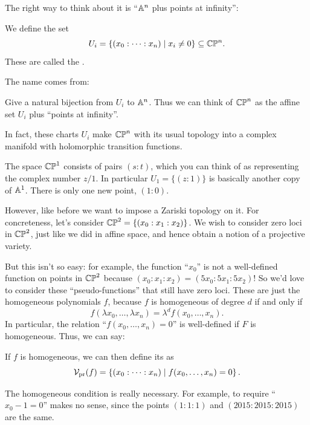 The right way to think about it is ``$\mathbb A^n$ plus points at infinity'':
\begin{definition}
	We define the set
	\[ U_i = \left\{ (x_0 : \dots : x_n) \mid x_i \neq 0  \right\}
		\subseteq \mathbb{CP}^n. \]
	These are called the .
\end{definition}
The name comes from:
\begin{exercise}
	[Mandatory]
	Give a natural bijection from $U_i$ to $\mathbb A^n$.
	Thus we can think of $\mathbb{CP}^n$ as the affine set $U_i$
	plus ``points at infinity''.
\end{exercise}
\begin{remark}
	In fact, these charts $U_i$ make $\mathbb{CP}^n$ with its usual topology
	into a complex manifold with holomorphic transition functions.
\end{remark}

\begin{example}
	[Colloquially, $\CP^1 = \Aff^1 \cup \{\infty\}$]
	The space $\mathbb{CP}^1$ consists of pairs $(s:t)$,
	which you can think of as representing the complex number $z/1$.
	In particular $U_1 = \{ (z:1) \}$
	is basically another copy of $\mathbb A^1$.
	There is only one new point, $(1:0)$.
\end{example}

However, like before we want to impose a Zariski topology on it.
For concreteness, let's consider $\mathbb{CP}^2 = \left\{ (x_0 : x_1 : x_2) \right\}$.
We wish to consider zero loci in $\mathbb{CP}^2$, just like we did in affine space,
and hence obtain a notion of a projective variety.

But this isn't so easy: for example,
the function ``$x_0$'' is not a well-defined function on points in $\mathbb{CP}^2$
because $(x_0 : x_1 : x_2) = (5x_0 : 5x_1 : 5x_2)$!
So we'd love to consider these ``pseudo-functions''
that still have zero loci. These are just the homogeneous polynomials $f$,
because $f$ is homogeneous of degree $d$ if and only if
\[
	f(\lambda x_0, \dots, \lambda x_n)
	= \lambda^d f(x_0, \dots, x_n).
\]
In particular, the relation ``$f(x_0, \dots, x_n) = 0$'' is
well-defined if $F$ is homogeneous. Thus, we can say:
\begin{definition}
	If $f$ is homogeneous, we can then define its  as
	\[
		\mathcal V_{\text{pr}}(f)
		= \left\{ (x_0 : \dots : x_n) \mid f(x_0, \dots, x_n) = 0 \right\}.
	\]
\end{definition}

The homogeneous condition is really necessary.
For example, to require ``$x_0 - 1 = 0$'' makes no sense,
since the points $(1:1:1)$ and $(2015:2015:2015)$ are the same.

